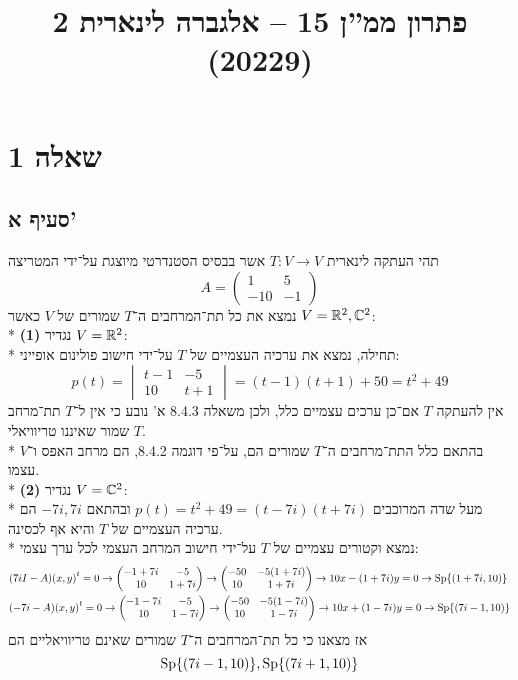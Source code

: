 
\title{פתרון ממ''ן 15 – אלגברה לינארית 2 (20229)}


\maketitle

\section{שאלה 1}
\subsection{סעיף א'}
תהי העתקה לינארית $T : V \to V$ אשר בבסיס הסטנדרטי מיוצגת על־ידי המטריצה
\[
	A = \begin{pmatrix}
		1 & 5 \\
		-10 & -1
	\end{pmatrix}
\]
נמצא את כל תת־המרחבים ה־$T$ שמורים של $V$ כאשר $V = \mathbb{R}^2, \mathbb{C}^2$: \\*
\textbf{(1)}
נגדיר $V = \mathbb{R}^2$: \\*
תחילה, נמצא את ערכיה העצמיים של $T$ על־ידי חישוב פולינום אופייני:
\[
	p(t) = \begin{vmatrix}
		t - 1 & -5 \\
		10 & t + 1
	\end{vmatrix}
	= (t - 1)(t + 1) + 50
	= t^2 + 49
\]
אין להעתקה $T$ אם־כן ערכים עצמיים כלל, ולכן משאלה 8.4.3 א' נובע כי אין ל־$T$ תת־מרחב $T$ שמור שאיננו טריוויאלי. \\*
בהתאם כלל התת־מרחבים ה־$T$ שמורים הם, על־פי דוגמה 8.4.2, הם מרחב האפס ו־$V$ עצמו. \\*
\textbf{(2)}
נגדיר $V = \mathbb{C}^2$: \\*
מעל שדה המרוכבים $p(t) = t^2 + 49 = (t - 7i)(t + 7i)$ ובהתאם $-7i, 7i$ הם ערכיה העצמיים של $T$ והיא אף לכסינה. \\*
נמצא וקטורים עצמיים של $T$ על־ידי חישוב המרחב העצמי לכל ערך עצמי:
\begin{align*}
	& (7i I - A) {(x, y)}^t = 0 \rightarrow
	\begin{pmatrix}
		-1 + 7i & -5 \\
		10 & 1 + 7i
	\end{pmatrix}
	\rightarrow
	\begin{pmatrix}
		-50 & -5(1 + 7i) \\
		10 & 1 + 7i
	\end{pmatrix}
	\rightarrow
	10x - (1 + 7i)y = 0
	\rightarrow
	\operatorname{Sp}\{ (1 + 7i, 10) \} \\
	& (-7i - A) {(x, y)}^t = 0
	\rightarrow
	\begin{pmatrix}
		-1 -7i & -5 \\
		10 & 1 - 7i
	\end{pmatrix}
	\rightarrow
	\begin{pmatrix}
		-50 & -5(1 - 7i) \\
		10 & 1 - 7i
	\end{pmatrix}
	\rightarrow
	10x + (1 - 7i)y = 0
	\rightarrow
	\operatorname{Sp}\{ (7i - 1, 10) \}
\end{align*}
אז מצאנו כי כל תת־המרחבים ה־$T$ שמורים שאינם טריוויאליים הם
\[
	\operatorname{Sp}\{ (7i - 1, 10) \},
	\operatorname{Sp}\{ (7i + 1, 10) \}
\]

